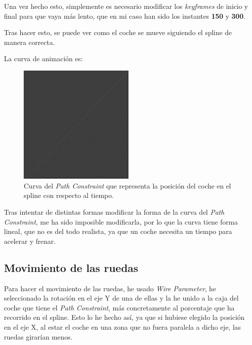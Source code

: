 \bigskip

Una vez hecho esto, simplemente es necesario modificar los \textit{keyframes} de inicio y final para que vaya más lento, que en mi caso han sido los instantes \textbf{150} y \textbf{300}.

\bigskip

Tras hacer esto, se puede ver como el coche se mueve siguiendo el spline de manera correcta.

\bigskip

\newpage

La curva de animación es:

\begin{figure}[H]
    \centering
   \includegraphics[width=0.5\textwidth]{imagenes/coche/pathConstraint.png}
   \caption{Curva del \textit{Path Constraint} que representa la posición del coche en el spline con respecto al tiempo.}
\end{figure}

Tras intentar de distintas formas modificar la forma de la curva del \textit{Path Constraint}, me ha sido imposible modificarla, por lo que la curva tiene forma lineal, que no es del todo realista, ya que un coche necesita un tiempo para acelerar y frenar.

\subsection{Movimiento de las ruedas}

Para hacer el movimiento de las ruedas, he usado \textit{Wire Parameter}, he seleccionado la rotación en el eje Y de una de ellas y la he unido a la caja del coche que tiene el \textit{Path Constraint}, más concretamente al porcentaje que ha recorrido en el spline. Esto lo he hecho así, ya que si hubiese elegido la posición en el eje X, al estar el coche en una zona que no fuera paralela a dicho eje, las ruedas girarían menos.

